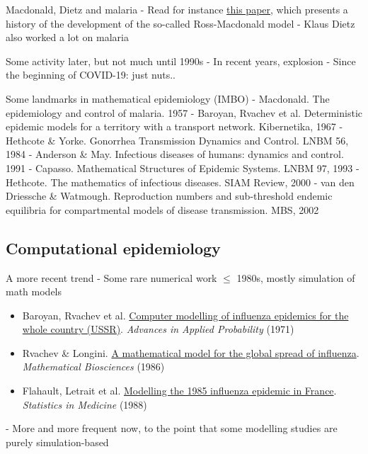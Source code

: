 \documentclass[aspectratio=43]{beamer}
\begin{document}
\begin{frame}{Macdonald, Dietz and malaria}
- Read for instance \href{https://doi.org/10.1371/journal.ppat.1002588}{this paper}, which presents a history of the development of the so-called Ross-Macdonald model
\vfill
- Klaus Dietz also worked a lot on malaria
\end{frame}
    
    
\begin{frame}{Some activity later, but not much until 1990s}
- In recent years, explosion
\vfill
- Since the beginning of COVID-19: just nuts..
\end{frame}

\begin{frame}{Some landmarks in mathematical epidemiology (IMBO)}
- Macdonald. The epidemiology and control of malaria. 1957
\vfill
- Baroyan, Rvachev et al. Deterministic epidemic models for a territory with a transport network. Kibernetika, 1967
\vfill
- Hethcote \& Yorke. Gonorrhea Transmission Dynamics and Control. LNBM 56, 1984
\vfill
- Anderson \& May. Infectious diseases of humans: dynamics and control. 1991
\vfill
- Capasso. Mathematical Structures of Epidemic Systems. LNBM 97, 1993
\vfill
- Hethcote. The mathematics of infectious diseases. SIAM Review, 2000
\vfill
- van den Driessche \& Watmough. Reproduction numbers and sub-threshold endemic equilibria for compartmental models of disease transmission. MBS, 2002      
\end{frame}


\subsection{Computational epidemiology}

\begin{frame}{A more recent trend}
- Some rare numerical work $\leq$ 1980s, mostly simulation of math models
\begin{itemize}
    \item Baroyan, Rvachev et al. \href{https://doi.org/10.2307/1426167}{Computer modelling of influenza epidemics for the whole country (USSR)}. \emph{Advances in Applied Probability} (1971) 
    \item Rvachev \& Longini. \href{https://doi.org/10.1016/0025-5564(85)90064-1}{A mathematical model for the global spread of influenza}. \emph{Mathematical Biosciences} (1986) 
    \item Flahault, Letrait et al. \href{https://doi.org/10.1002/sim.4780071107}{Modelling the 1985 influenza epidemic in France}. \emph{Statistics in Medicine} (1988)
\end{itemize}
\vfill
- More and more frequent now, to the point that some modelling studies are purely simulation-based
\end{frame}
\end{document}
